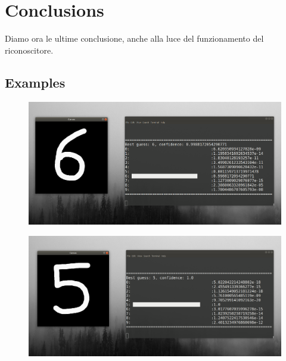 \documentclass[12pt]{article}
\begin{document}
\section{Conclusions}

Diamo ora le ultime conclusione, anche alla luce del funzionamento
del riconoscitore.


\subsection{Examples}

\begin{figure}[H]{}
    \centering
    \includegraphics[scale=1]{../images/6ok.png}
    \label{fig:cc}
\end{figure}

\begin{figure}[H]{}
    \centering
    \includegraphics[scale=1]{../images/5ok.png}
    \label{fig:cc}
\end{figure}
\end{document}

